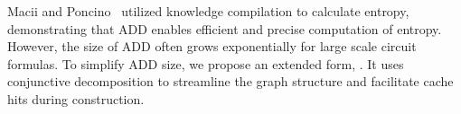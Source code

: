 Macii and Poncino~\cite{macii1996exact} utilized knowledge compilation to calculate entropy, demonstrating that ADD enables efficient and precise computation of entropy.
However, the size of ADD often grows exponentially for large scale circuit formulas. To simplify ADD size, we propose an extended form, \ADDAND. It uses conjunctive decomposition to streamline the graph structure and facilitate cache hits during construction. 

 


